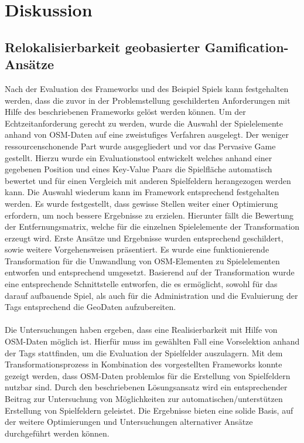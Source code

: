 \chapter{Diskussion}
\label{sec:S7_Diskussion}

\section{Relokalisierbarkeit geobasierter Gamification-Ansätze}

Nach der Evaluation des Frameworks und des Beispiel Spiels kann festgehalten werden, dass die zuvor in der Problemstellung geschilderten Anforderungen mit Hilfe des beschriebenen Frameworks gelöst werden können. Um der Echtzeitanforderung gerecht zu werden, wurde die Auswahl der Spielelemente anhand von OSM-Daten auf eine zweistufiges Verfahren ausgelegt. Der weniger ressourcenschonende Part wurde ausgegliedert und vor das Pervasive Game gestellt. Hierzu wurde ein Evaluationstool entwickelt welches anhand einer gegebenen Position und eines Key-Value Paars die Spielfläche automatisch bewertet und für einen Vergleich mit anderen Spielfeldern herangezogen werden kann.
Die Auswahl wiederum kann im Framework entsprechend festgehalten werden. Es wurde festgestellt, dass gewisse Stellen weiter einer Optimierung erfordern, um noch bessere Ergebnisse zu erzielen.
Hierunter fällt die Bewertung der Entfernungsmatrix, welche für die einzelnen Spielelemente der Transformation erzeugt wird. Erste Ansätze und Ergebnisse wurden entsprechend geschildert, sowie weitere Vorgehensweisen präsentiert.
Es wurde eine funktionierende Transformation für die Umwandlung von OSM-Elementen zu Spielelementen entworfen und entsprechend umgesetzt.
Basierend auf der Transformation wurde eine entsprechende Schnittstelle entworfen, die es ermöglicht, sowohl für das darauf aufbauende Spiel, als auch für die Administration und die Evaluierung der Tags entsprechend die GeoDaten aufzubereiten.
\\\\
Die Untersuchungen haben ergeben, dass eine Realisierbarkeit mit Hilfe von OSM-Daten möglich ist. Hierfür muss im gewählten Fall eine Vorselektion anhand der Tags stattfinden, um die Evaluation der Spielfelder auszulagern. Mit dem Transformationsprozess in Kombination des vorgestellten Frameworks konnte gezeigt werden, dass OSM-Daten problemlos für die Erstellung von Spielfeldern nutzbar sind. Durch den beschriebenen Lösungsansatz wird ein entsprechender Beitrag zur Untersuchung von Möglichkeiten zur automatischen/unterstützen Erstellung von Spielfeldern geleistet. Die Ergebnisse bieten eine solide Basis, auf der weitere Optimierungen  und Untersuchungen alternativer Ansätze durchgeführt werden können.

